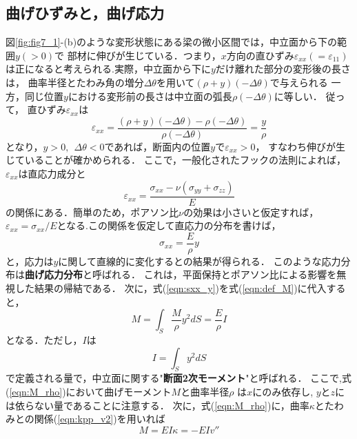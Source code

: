 \documentclass[10pt,a4j]{jbook}
\begin{document}
\subsection{曲げひずみと，曲げ応力}
図\ref{fig:fig7_1}-(b)のような変形状態にある梁の微小区間では，中立面から下の範囲$y(>0)$で
部材に伸びが生じている．つまり，$x$方向の直ひずみ$\varepsilon_{xx}(=\varepsilon_{11})$
は正になると考えられる.実際，中立面から下に$y$だけ離れた部分の変形後の長さは，
曲率半径とたわみ角の増分$\Delta \theta$を用いて$(\rho + y )(-\Delta \theta)$で与えられる
一方，同じ位置$y$における変形前の長さは中立面の弧長$\rho (-\Delta \theta)$に等しい．
従って， 直ひずみ$\varepsilon_{xx}$は
\begin{equation}
	\varepsilon_{xx}
	=
	\frac{(\rho +y )(-\Delta \theta) - \rho (-\Delta \theta)}{\rho (-\Delta \theta)}
	=
	\frac{y}{\rho}
\end{equation}
となり，$y>0, \ \ \Delta \theta<0$であれば，断面内の位置$y$で$\varepsilon_{xx}>0$，
すなわち伸びが生じていることが確かめられる．
ここで，一般化されたフックの法則によれば， $\varepsilon_{xx}$は直応力成分と
\begin{equation}
	\varepsilon_{xx}=\frac{\sigma_{xx}-\nu(\sigma_{yy}+\sigma_{zz})}{E}
\end{equation}
の関係にある．簡単のため，ポアソン比$\nu$の効果は小さいと仮定すれば，
$\varepsilon_{xx}=\sigma_{xx}/E$となる.この関係を仮定して直応力の分布を書けば，
\begin{equation}
	\sigma_{xx}=\frac{E}{\rho}y
	\label{eqn:sxx_y}
\end{equation}
と，応力は$y$に関して直線的に変化するとの結果が得られる．
このような応力分布は{\bf 曲げ応力分布}と呼ばれる．
これは，平面保持とポアソン比による影響を無視した結果の帰結である．
次に，式(\ref{eqn:sxx_y})を式(\ref{eqn:def_M})に代入すると，
\begin{equation}
	M=\int_S \frac{M}{\rho}y^2 dS=\frac{E}{\rho}I
	\label{eqn:M_rho}
\end{equation}
となる．ただし，$I$は
\begin{equation}
	I=\int_S y^2 dS
	\label{eqn:def_I}
\end{equation}
で定義される量で，中立面に関する"{\bf 断面2次モーメント}"と呼ばれる．
ここで,式(\ref{eqn:M_rho})において曲げモーメント$M$と曲率半径$\rho$
は$x$にのみ依存し, $y$と$z$には依らない量であることに注意する．
次に，式(\ref{eqn:M_rho})に，曲率$\kappa$とたわみとの関係(\ref{eqn:kpp_v2})を用いれば
\begin{equation}
	M = EI \kappa = -EIv''
	\label{eqn:M_kpp}
\end{equation}
\end{document}
